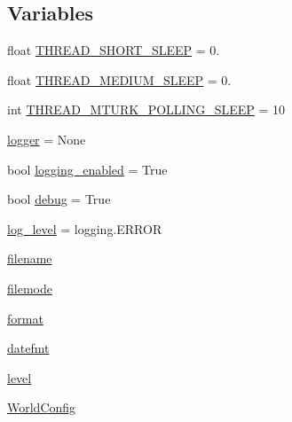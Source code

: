 \subsection*{Variables}
\begin{DoxyCompactItemize}
\item 
float \hyperlink{namespaceparlai_1_1messenger_1_1core_1_1shared__utils_a816b9c6fd6f3b9a8af30b231da02d2f5}{T\+H\+R\+E\+A\+D\+\_\+\+S\+H\+O\+R\+T\+\_\+\+S\+L\+E\+EP} = 0.
\item 
float \hyperlink{namespaceparlai_1_1messenger_1_1core_1_1shared__utils_af97462afed9861b75733d63c56a1ae00}{T\+H\+R\+E\+A\+D\+\_\+\+M\+E\+D\+I\+U\+M\+\_\+\+S\+L\+E\+EP} = 0.
\item 
int \hyperlink{namespaceparlai_1_1messenger_1_1core_1_1shared__utils_a5a8a9bdfd70ed339c91ed57c9c7c7065}{T\+H\+R\+E\+A\+D\+\_\+\+M\+T\+U\+R\+K\+\_\+\+P\+O\+L\+L\+I\+N\+G\+\_\+\+S\+L\+E\+EP} = 10
\item 
\hyperlink{namespaceparlai_1_1messenger_1_1core_1_1shared__utils_ab5552ead02cf5a7025cd186e672060c8}{logger} = None
\item 
bool \hyperlink{namespaceparlai_1_1messenger_1_1core_1_1shared__utils_ad31ea941cbabcbf27c37c58e80f9438d}{logging\+\_\+enabled} = True
\item 
bool \hyperlink{namespaceparlai_1_1messenger_1_1core_1_1shared__utils_a9fb5f523462a24e96dd13deb8f589750}{debug} = True
\item 
\hyperlink{namespaceparlai_1_1messenger_1_1core_1_1shared__utils_aeb7e4e914e88a3fd7f745417a265b697}{log\+\_\+level} = logging.\+E\+R\+R\+OR
\item 
\hyperlink{namespaceparlai_1_1messenger_1_1core_1_1shared__utils_a3ed224fbea7d53f6bdfcc9d5166b31f0}{filename}
\item 
\hyperlink{namespaceparlai_1_1messenger_1_1core_1_1shared__utils_a1a10b7e4195d2aca7c7a6c8b9c062bdb}{filemode}
\item 
\hyperlink{namespaceparlai_1_1messenger_1_1core_1_1shared__utils_a11f2820425bccac8d8d490ab505bcb79}{format}
\item 
\hyperlink{namespaceparlai_1_1messenger_1_1core_1_1shared__utils_a29c5d1df883af60f5b86803d3d2b57dd}{datefmt}
\item 
\hyperlink{namespaceparlai_1_1messenger_1_1core_1_1shared__utils_a99fb4611391707176393ddf07d4af7d5}{level}
\item 
\hyperlink{namespaceparlai_1_1messenger_1_1core_1_1shared__utils_a239b1df98babc27cadb48981864a092a}{World\+Config}
\end{DoxyCompactItemize}


